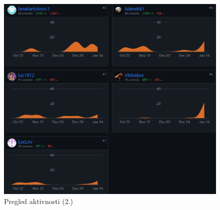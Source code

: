 		\begin{figure}[H]
			\includegraphics[scale=0.7]{slike/pregled_promjena_2.PNG} 
			\centering
			\caption{Pregled aktivnosti (2.)}
			\label{pregled_promjena_2}
		\end{figure}
